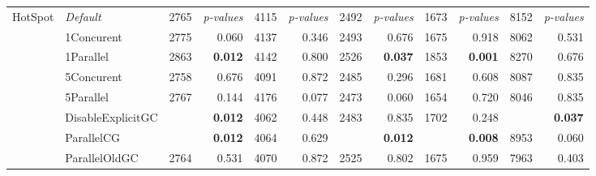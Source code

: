 \begin{table*}
{\begin{tabular}{cl|rr|rr|rr|rr|rr}
			\hline
			\multirow{11}{*}{\sc HotSpot}
			    & \em Default         & 2765                    & \em p-values               & 4115                      & \em p-values           & 2492                      & \em p-values            & 1673                         & \em p-values                 & 8152                        & \em p-values       	 \\
			    & 1Concurent          & 2775                    &  0.060                  & 4137                      & 0.346                  & 2493                      & 0.676                   & 1675                         & 0.918                        & 8062                        & 0.531                    	 \\
			    & 1Parallel           & 2863                    & \bf 0.012                  & 4142                      & 0.800                  & 2526                      & \bf 0.037               & 1853                         & \bf 0.001                    & 8270                        & 0.676              	 \\
			    & 5Concurent          & 2758                    & 0.676                      & 4091                      & 0.872                  & 2485                      & 0.296                   & 1681                         & 0.608                        & 8087                        & 0.835              	 \\
			    & 5Parallel           & 2767                    & 0.144                      & 4176                      & 0.077                  & 2473                      & 0.060                   & 1654                         & 0.720                        & 8046                        & 0.835              	 \\
			    & DisableExplicitGC   & \best 2734                    & \bf 0.012                  & 4062                      & 0.448                  & 2483                      & 0.835                   & 1702                         & 0.248                        & \best 7710              & \bf 0.037   	 \\
			    & ParallelCG          & \best 2653                    & \bf 0.012                  & 4064                      & 0.629                  & \best  2356               & \bf 0.012             & \best 1602                   & \bf 0.008                  & 8953                        & 0.060      \\
			    & ParallelOldGC       & 2764                    & 0.531                      & 4070                      & 0.872                  & 2525                      & 0.802                   & 1675                         & 0.959                        & 7963                        & 0.403       \\

\end{tabular}}
\end{table*}
